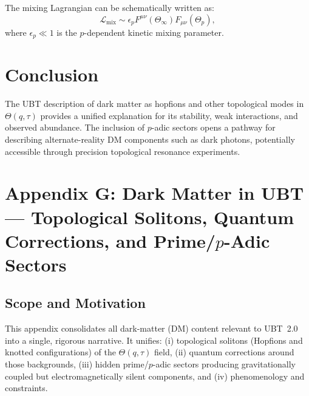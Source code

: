 \documentclass[12pt,a4paper]{article}
\begin{document}
The mixing Lagrangian can be schematically written as:
\begin{equation}
\mathcal{L}_{\mathrm{mix}} \sim \epsilon_{p} F^{\mu\nu}(\Theta_{\infty}) F_{\mu\nu}(\Theta_p),
\end{equation}
where $\epsilon_{p} \ll 1$ is the $p$-dependent kinetic mixing parameter.

\section{Conclusion}
The UBT description of dark matter as hopfions and other topological modes in $\Theta(q,\tau)$ provides a unified explanation for its stability, weak interactions, and observed abundance. The inclusion of $p$-adic sectors opens a pathway for describing alternate-reality DM components such as dark photons, potentially accessible through precision topological resonance experiments.

\section{Appendix G: Dark Matter in UBT --- Topological Solitons, Quantum Corrections, and Prime/$p$-Adic Sectors}
\label{app:dm-consolidated}

\subsection{Scope and Motivation}
This appendix consolidates all dark-matter (DM) content relevant to UBT~2.0 into a single, rigorous narrative.
It unifies: (i) topological solitons (Hopfions and knotted configurations) of the $\Theta(q,\tau)$ field,
(ii) quantum corrections around those backgrounds, (iii) hidden prime/$p$-adic sectors producing gravitationally coupled but electromagnetically silent components,
and (iv) phenomenology and constraints.
\end{document}
